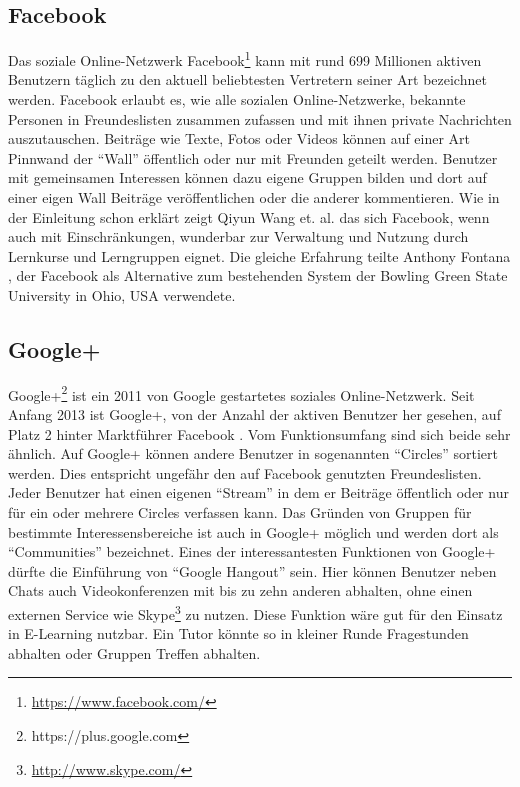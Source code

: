 
\subsection{Facebook} %
\label{sub:facebook}

Das soziale Online-Netzwerk Facebook\footnote{\url{https://www.facebook.com/}} kann mit rund 699 Millionen aktiven Benutzern täglich \cite{Facebook2013} zu den aktuell beliebtesten Vertretern seiner Art bezeichnet werden. Facebook erlaubt es, wie alle sozialen Online-Netzwerke, bekannte Personen in Freundeslisten zusammen zufassen und mit ihnen private Nachrichten auszutauschen. Beiträge wie Texte, Fotos oder Videos können auf einer Art Pinnwand der \enquote{Wall} öffentlich oder nur mit Freunden geteilt werden. Benutzer mit gemeinsamen Interessen können dazu eigene Gruppen bilden und dort auf einer eigen Wall Beiträge veröffentlichen oder die anderer kommentieren. Wie in der Einleitung schon erklärt zeigt Qiyun Wang et. al. \cite{Wang2012} das sich Facebook, wenn auch mit Einschränkungen, wunderbar zur Verwaltung und Nutzung durch Lernkurse und Lerngruppen eignet. Die gleiche Erfahrung teilte Anthony Fontana \cite{Fontana2009,FacebookinEducarion2010}, der Facebook als Alternative zum bestehenden System der Bowling Green State University in Ohio, USA verwendete.



\subsection{Google+} %
\label{sub:google_plus}

Google+\footnote{https://plus.google.com} ist ein 2011 von Google gestartetes soziales Online-Netzwerk. Seit Anfang 2013 ist Google+, von der Anzahl der aktiven Benutzer her gesehen, auf Platz 2 hinter Marktführer Facebook \cite{Thomas2013}. Vom Funktionsumfang sind sich beide sehr ähnlich. Auf Google+ können andere Benutzer in sogenannten \enquote{Circles} sortiert werden. Dies entspricht ungefähr den auf Facebook genutzten Freundeslisten. Jeder Benutzer hat einen eigenen \enquote{Stream} in dem er Beiträge öffentlich oder nur für ein oder mehrere Circles verfassen kann. Das Gründen von Gruppen für bestimmte Interessensbereiche ist auch in Google+ möglich und werden dort als \enquote{Communities} bezeichnet. Eines der interessantesten Funktionen von Google+ dürfte die Einführung von \enquote{Google Hangout} sein. Hier können Benutzer neben Chats auch Videokonferenzen mit bis zu zehn anderen abhalten, ohne einen externen Service wie Skype\footnote{\url{http://www.skype.com/}} zu nutzen. Diese Funktion wäre gut für den Einsatz in E-Learning nutzbar. Ein Tutor könnte so in kleiner Runde Fragestunden abhalten oder Gruppen Treffen abhalten.

